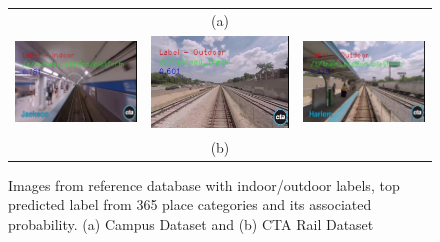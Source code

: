 \documentclass[letterpaper, 10 pt, conference]{ieeeconf}  %
\begin{document}
\begin{figure}[!htbp]
\begin{tabular*}{\textwidth}{lcr}
  & (a) & \\
  \includegraphics[scale=\scaleVal]{6-subwayStation} &
  \includegraphics[scale=\scaleVal]{7-railroadTrack} &
  \includegraphics[scale=\scaleVal]{8-trainStation} \\
  & (b) &
 \end{tabular*}
 \caption{Images from reference database with indoor/outdoor labels, top predicted label from 365 place categories and its associated probability. (a) Campus Dataset and (b) CTA Rail Dataset}
 \label{fig:labelledImages}
\end{figure}
\end{document}
